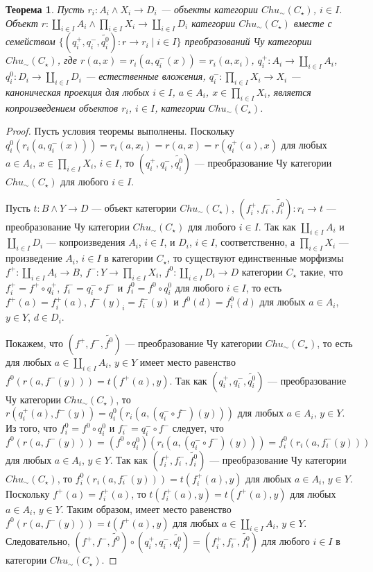 \documentclass[a4paper,12pt]{article}
\newtheorem{theorem}{Теорема}
\begin{document}
\begin{theorem}\label{coproduct-c}
    Пусть $r_i: A_i \wedge X_i \to D_i$ --- объекты категории $Chu_\sim(C_\star)$, $i \in I$. Объект $r: \coprod_{i \in I} A_i \wedge \prod_{i \in I} X_i \to \coprod_{i \in I} D_i$ категории $Chu_\sim(C_\star)$ вместе с семейством $\{(q^+_i,q^-_i,\widetilde{q^0_i}): r \to r_i \mid i \in I\}$ преобразований Чу категории $Chu_\sim(C_\star)$, где $r(a,x) = r_i(a,q^-_i(x)) = r_i(a, x_i)$, $q^+_i: A_i \to \coprod_{i \in I} A_i$, $q^0_i: D_i \to \coprod_{i \in I} D_i$ --- естественные вложения, $q^-_i: \prod_{i \in I} X_i \to X_i$ --- каноническая проекция для любых $i \in I$, $a \in A_i$, $x \in \prod_{i \in I} X_i$, является копроизведением объектов $r_i$, $i \in I$, категории $Chu_\sim(C_\star)$.
\end{theorem}
\begin{proof}
    Пусть условия теоремы выполнены. Поскольку $q^0_i(r_i(a,q^-_i(x))) = r_i(a,x_i) = r(a,x) = r(q^+_i(a),x)$ для любых $a \in A_i$, $x \in \prod_{i \in I} X_i$, $i \in I$, то $(q^+_i, q^-_i, \widetilde{q^0_i})$ --- преобразование Чу категории $Chu_\sim(C_\star)$ для любого $i \in I$.

    Пусть $t: B \wedge Y \to D$ --- объект категории $Chu_\sim(C_\star)$, $(f^+_i,f^-_i,\widetilde{f^0_i}): r_i \to t$ --- преобразование Чу категории $Chu_\sim(C_\star)$ для любого $i \in I$. Так как $\coprod_{i \in I} A_i$ и $\coprod_{i \in I} D_i$ --- копроизведения $A_i$, $ i \in I$, и $D_i$, $i \in I$, соответственно, а $\prod_{i \in I} X_i$ --- произведение $A_i$, $i \in I$ в категории $C_\star$, то существуют единственные морфизмы $f^+: \coprod_{i \in I} A_i \to B$, $f^-: Y \to \prod_{i \in I} X_i$, $f^0: \coprod_{i \in I} D_i \to D$ категории $C_\star$ такие, что $f^+_i = f^+ \circ q^+_i$, $f^-_i = q^-_i \circ f^-$ и $f^0_i = f^0 \circ q^0_i$ для любого $i \in I$, то есть $f^+(a) = f^+_i(a)$, $f^-(y)_i = f^-_i(y)$ и $f^0(d) = f^0_i(d)$ для любых $a \in A_i$, $y \in Y$, $d \in D_i$. 

    Покажем, что $(f^+,f^-,\widetilde{f^0})$ --- преобразование Чу категории $Chu_\sim(C_\star)$, то есть для любых $a \in \coprod_{i \in I} A_i$, $y \in Y$ имеет место равенство $f^0(r(a,f^-(y))) = t(f^+(a),y)$. Так как $(q^+_i,q^-_i,\widetilde{q^0_i})$ --- преобразование Чу категории $Chu_\sim(C_\star)$, то $r(q^+_i(a),f^-(y)) = q^0_i(r_i(a,(q^-_i \circ f^-)(y)))$ для любых $a \in A_i$, $y \in Y$. Из того, что $f^0_i = f^0 \circ q^0_i$ и $f^-_i = q^-_i \circ f^-$ следует, что $f^0(r(a,f^-(y))) = (f^0 \circ q^0_i)(r_i(a,(q^-_i \circ f^-)(y))) = f^0_i(r_i(a,f^-_i(y)))$ для любых $a \in A_i$, $y \in Y$. Так как $(f^+_i,f^-_i,\widetilde{f^0_i})$ --- преобразование Чу категории $Chu_\sim(C_\star)$, то $f^0_i(r_i(a,f^-_i(y))) = t(f^+_i(a),y)$ для любых $a \in A_i$, $y \in Y$. Поскольку $f^+(a) = f^+_i(a)$, то $t(f^+_i(a),y) = t(f^+(a),y)$ для любых $a \in A_i$, $y \in Y$. Таким образом, имеет место равенство $f^0(r(a,f^-(y))) = t(f^+(a),y)$ для любых $a \in \coprod_{i \in I} A_i$, $y \in Y$.
    Следовательно, $(f^+,f^-,\widetilde{f^0}) \circ (q^+_i, q^-_i, \widetilde{q^0_i}) = (f^+_i, f^-_i, \widetilde{f^0_i})$ для любого $i \in I$ в категории $Chu_\sim(C_\star)$.
\end{proof}
\end{document}
